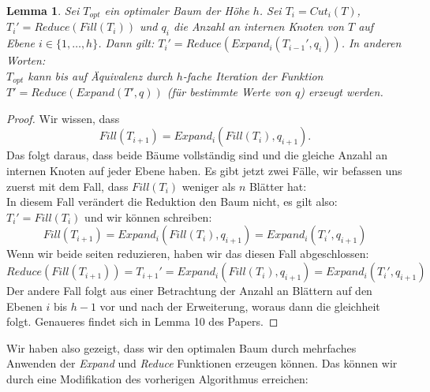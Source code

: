 \documentclass[a4paper,10pt,ngerman]{scrartcl}
\newtheorem{lemma}[satz]{Lemma}
\begin{document}
    \begin{lemma}
        Sei $T_{opt}$ ein optimaler Baum der Höhe $h$.
        Sei $T_i = Cut_i(T)$, $T_i' = Reduce(Fill(T_i))$ und $q_i$ die Anzahl an internen Knoten von $T$ auf Ebene $i \in \{1, \dots, h\}$.
        Dann gilt: $T_i' = Reduce(Expand_i(T_{i-1}', q_i))$.
        In anderen Worten: \\
        $T_{opt}$ kann bis auf Äquivalenz durch $h$-fache Iteration der Funktion $T' = Reduce(Expand(T',q))$ (für bestimmte Werte von $q$) erzeugt werden.
    \end{lemma}
    \begin{proof}
        Wir wissen, dass
        \[Fill(T_{i+1}) = Expand_i(Fill(T_i), q_{i+1}).\]
        Das folgt daraus, dass beide Bäume vollständig sind und die gleiche Anzahl an internen Knoten auf jeder Ebene haben.
        Es gibt jetzt zwei Fälle, wir befassen uns zuerst mit dem Fall, dass $Fill(T_i)$ weniger als $n$ Blätter hat: \\
        In diesem Fall verändert die Reduktion den Baum nicht, es gilt also: $T_i' = Fill(T_i)$ und wir können schreiben:
        \[Fill(T_{i+1}) = Expand_i(Fill(T_i), q_{i+1}) = Expand_i(T_i', q_{i+1})\]
        Wenn wir beide seiten reduzieren, haben wir das diesen Fall abgeschlossen:
        \[Reduce(Fill(T_{i+1})) = T_{i+1}' = Expand_i(Fill(T_i), q_{i+1}) = Expand_i(T_i', q_{i+1})\]
        Der andere Fall folgt aus einer Betrachtung der Anzahl an Blättern auf den Ebenen $i$ bis $h-1$ vor und nach der Erweiterung, woraus dann die gleichheit folgt.
        Genaueres findet sich in Lemma 10 des Papers\autocite{golin_dynamic_1998}.
    \end{proof}
    Wir haben also gezeigt, dass wir den optimalen Baum durch mehrfaches Anwenden der \textit{Expand} und \textit{Reduce} Funktionen erzeugen können.
    Das können wir durch eine Modifikation des vorherigen Algorithmus erreichen:
\end{document}
